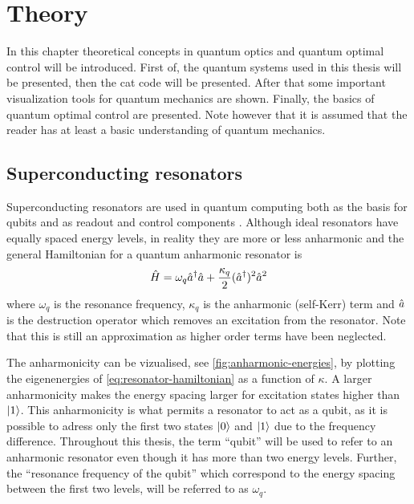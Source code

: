 \documentclass[main.tex]{subfiles}
\begin{document}
\chapter{Theory}
In this chapter theoretical concepts in quantum optics and quantum optimal control will be introduced.
First of, the quantum systems used in this thesis will be presented, then the cat code will be presented.
After that some important visualization tools for quantum mechanics are shown.
Finally, the basics of quantum optimal control are presented.
Note however that it is assumed that the reader has at least a basic understanding of quantum mechanics.

\section{Superconducting resonators}
Superconducting resonators are used in quantum computing both as the basis for qubits and as readout and control components \cite{}.
Although ideal resonators have equally spaced energy levels, in reality they are more or less anharmonic and the general Hamiltonian for a quantum anharmonic resonator is
\begin{equation}
    \hat{H} = \omega_{q} \hat{a}^\dagger\hat{a} + \frac{\kappa_q}{2} (\hat{a}^\dagger)^2\hat{a}^2
    \label{eq:resonator-hamiltonian}
\end{equation}
where \( \omega_{q} \) is the resonance frequency, \( \kappa_q \) is the anharmonic (self-Kerr) term and \(\hat{a}\) is the destruction operator which removes an excitation from the resonator.
Note that this is still an approximation as higher order terms have been neglected.

The anharmonicity can be vizualised, see \cref{fig:anharmonic-energies}, by plotting the eigenenergies of \cref{eq:resonator-hamiltonian} as a function of \( \kappa \).
A larger anharmonicity makes the energy spacing larger for excitation states higher than \(\ket{1}\).
This anharmonicity is what permits a resonator to act as a qubit, as it is possible to adress only the first two states \( \ket{0} \) and \( \ket{1} \) due to the frequency difference.
Throughout this thesis, the term ``qubit'' will be used to refer to an anharmonic resonator even though it has more than two energy levels.
Further, the ``resonance frequency of the qubit'' which correspond to the energy spacing between the first two levels, will be referred to as \( \omega_{q} \).

\end{document}
